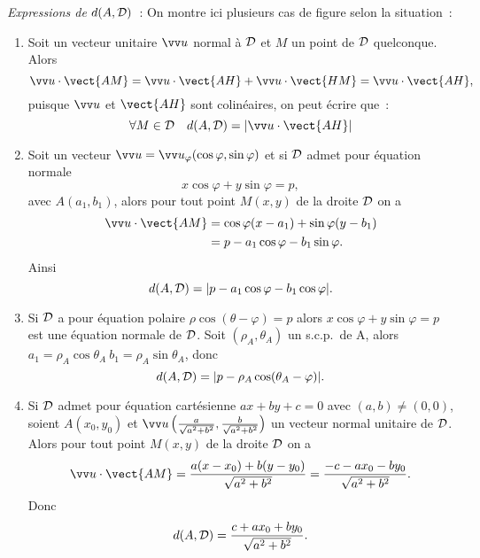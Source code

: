 \emph{Expressions de $d(A,\mathcal{D})$}~:
On montre ici plusieurs cas de figure selon la situation~:
\begin{enumerate}
\item Soit un vecteur unitaire $\vu$ normal à $\mathcal{D}$ et $M$ un point de $\mathcal{D}$ quelconque. Alors
  \begin{equation}
    \vu \cdot \vect{AM} = \vu \cdot \vect{AH} + \vu \cdot \vect{HM}=\vu \cdot \vect{AH},
  \end{equation}
  puisque $\vu$ et $\vect{AH}$ sont colinéaires, on peut écrire que~:
  \begin{equation}
    \forall M \in \Dr \quad d(A,\Dr)=|\vu \cdot \vect{AH}|
  \end{equation}
\item Soit un vecteur $\vu=\vu_\varphi(\cos \varphi, \sin \varphi)$ et si $\mathcal{D}$ admet pour équation normale
  \begin{equation}
    x \cos \varphi + y \sin \varphi=p,
  \end{equation}
  avec $A(a_1,b_1)$, alors pour tout point $M(x,y)$ de la droite $\mathcal{D}$ on a
  \begin{align}
    \vu \cdot \vect{AM} &= \cos \varphi (x-a_1) + \sin \varphi (y-b_1)\\
    &= p-a_1\cos\varphi -b_1\sin\varphi.
  \end{align}
  Ainsi
  \begin{equation}
    d(A,\mathcal{D})=|p-a_1\cos\varphi-b_1\cos\varphi|.
  \end{equation}
\item Si $\mathcal{D}$ a pour équation polaire $\rho\cos(\theta-\varphi)=p$ alors $x \cos \varphi + y \sin \varphi=p$ est une équation normale de $\mathcal{D}$. Soit $(\rho_A,\theta_A)$ un s.c.p.\ de A, alors $a_1=\rho_A\cos\theta_A \ b_1=\rho_A\sin\theta_A$, donc
  \begin{equation}
    d(A,\mathcal{D})=|p-\rho_A\cos(\theta_A-\varphi)|.
  \end{equation}
\item Si $\mathcal{D}$ admet pour équation cartésienne $ax+by+c=0$ avec $(a,b) \neq (0,0)$, soient $A(x_0,y_0)$ et $\vu \left(\frac{a}{\sqrt{a^2+b^2}}, \frac{b}{\sqrt{a^2+b^2}}\right)$ un vecteur normal unitaire de $\mathcal{D}$. Alors pour tout point $M(x,y)$ de la droite $\mathcal{D}$ on a
  \begin{equation}
      \vu\cdot\vect{AM}=\frac{a(x-x_0)+b(y-y_0)}{\sqrt{a^2+b^2}}=\frac{-c-ax_0-by_0}{\sqrt{a^2+b^2}}.
    \end{equation}
    Donc
    \begin{equation}
      d(A,\mathcal{D})=\frac{c+ax_0+by_0}{\sqrt{a^2+b^2}}.
    \end{equation}
  \end{enumerate}
  
